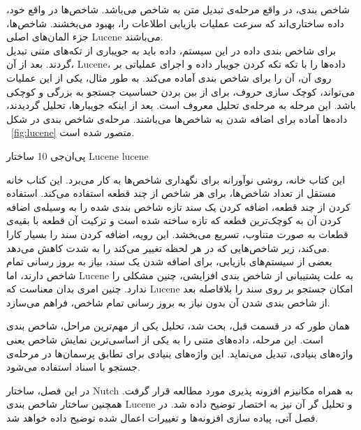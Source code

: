 شاخص بندی، در واقع مرحله‌ی تبدیل متن به شاخص می‌باشد. شاخص‌ها در واقع خود، داده ساختاری‌اند که سرعت عملیات بازیابی اطلاعات را، بهبود می‌بخشند. شاخص‌ها، جزء المان‌های اصلی Lucene می‌باشند.
\\
برای شاخص بندی داده در این سیستم، داده باید به جویباری از تکه‌های متنی تبدیل گردند. بعد از آن، Lucene، داده‌ها را با تکه تکه کردن جویبار داده و اجرای عملیاتی بر روی آن، آن را برای شاخص بندی آماده می‌کند. به طور مثال، یکی از این عملیات می‌تواند، کوچک سازی حروف، برای از بین بردن حساسیت جستجو به بزرگی و کوچکی باشد. این مرحله به مرحله‌ی تحلیل معروف است. بعد از اینکه جویبارها، تحلیل گردیدند، داده‌ها آماده برای اضافه شدن به شاخص‌ها می‌باشند. مرحله‌ی شاخص بندی در شکل ~\ref {fig:lucene} متصور شده است.

‌پی‌ان‌جی {10} {ساختار Lucene} {lucene}

این کتاب خانه، روشی نوآورانه برای نگهداری شاخص‌ها به کار می‌برد. این کتاب خانه مستقل از تعداد شاخص‌ها، برای هر شاخص از چند قطعه استفاده می‌کند. استفاده کردن از چند قطعه، اضافه کردن یک سند تازه شاخص بندی شده را به وسیله‌ی اضافه کردن آن به کوچک‌ترین قطعه که تازه ساخته شده است و ترکیت آن قطعه با بقیه‌ی قطعات به صورت متناوب، تسریع می‌بخشد. این رویه، اضافه کردن سند را بسیار کارا می‌کند، زیر شاخص‌هایی که در هر لحظه تغییر می‌کند را به شدت کاهش می‌دهد.
\\
بعضی از سیستم‌های بازیابی، برای اضافه شدن یک سند، بیاز به بروز رسانی تمام شاخص دارند، اما Lucene به علت پشتیبانی از شاخص بندی افزایشی، چنین مشکلی را ندارد. چنین امری بدان معناست که Lucene امکان جستجو بر روی سند را بلافاصله بعد از شاخص بندی شدن آن بدون نیاز به بروز رسانی تمام شاخص، فراهم می‌سازد.


همان طور که در قسمت قبل، بحث شد، تحلیل یکی از مهم‌ترین مراحل، شاخص بندی است. این مرحله، داده‌های متنی را به یکی از اساسی‌ترین نمایش شاخص یعنی واژه‌های بنیادی، تبدیل می‌نماید. این واژه‌های بنیادی برای تطابق پرسمان‌ها در مرحله‌ی جستجو با اسناد استفاده می‌شود.

در این فصل، ساختار Nutch به همراه مکانیزم افزونه پذیری مورد مطالعه قرار گرفت. همچنین ساختار شاخص بندی Lucene و تحلیل گر آن نیز به اختصار توضیح داده شد. در فصل آتی، پیاده سازی افزونه‌ها و تغییرات اعمال شده توضیح داده خواهد شد.
